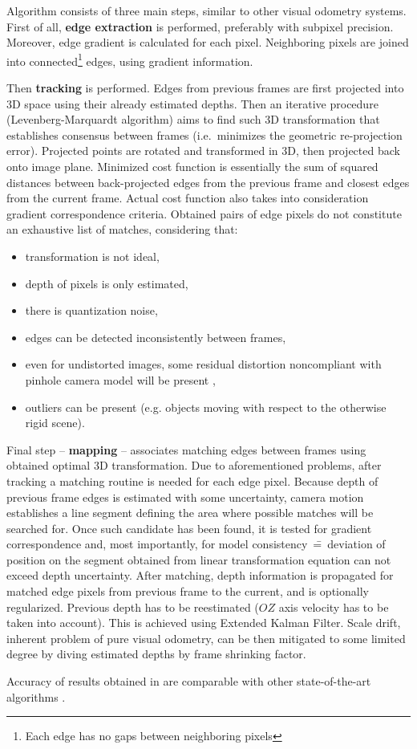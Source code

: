 Algorithm consists of three main steps, similar to other visual odometry systems. First of all, \textbf{edge extraction} is performed, preferably with subpixel precision. Moreover, edge gradient is calculated for each pixel. Neighboring pixels are joined into connected\footnote{Each edge has no gaps between neighboring pixels} edges, using gradient information.

Then \textbf{tracking} is performed. Edges from previous frames are first projected into 3D space using their already estimated depths. Then an iterative procedure (Levenberg-Marquardt algorithm) aims to find such 3D transformation that establishes consensus between frames (i.e.~minimizes the geometric re-projection error). Projected points are rotated and transformed in 3D, then projected back onto image plane. Minimized cost function is essentially the sum of squared distances between back-projected edges from the previous frame and closest edges from the current frame. Actual cost function also takes into consideration gradient correspondence criteria. Obtained pairs of edge pixels do not constitute an exhaustive list of matches, considering that:
\begin{itemize}
\item transformation is not ideal,
\item depth of pixels is only estimated,
\item there is quantization noise,
\item edges can be detected inconsistently between frames,
\item even for undistorted images, some residual distortion noncompliant with pinhole camera model will be present \cite{barreto2007non},
\item outliers can be present (e.g. objects moving with respect to the otherwise rigid scene).
\end{itemize}
 
Final step -- \textbf{mapping} -- associates matching edges between frames using obtained optimal 3D transformation. Due to aforementioned problems, after tracking a matching routine is needed for each edge pixel. Because depth of previous frame edges is estimated with some uncertainty, camera motion establishes a line segment defining the area where possible matches will be searched for. Once such candidate has been found, it is tested for gradient correspondence and, most importantly, for model consistency~\==~deviation of position on the segment obtained from linear transformation equation can not exceed depth uncertainty. After matching, depth information is propagated for matched edge pixels from previous frame to the current, and is optionally regularized. Previous depth has to be reestimated ($OZ$ axis velocity has to be taken into account). This is achieved using Extended Kalman Filter. Scale drift, inherent problem of pure visual odometry, can be then mitigated to some limited degree by diving estimated depths by frame shrinking factor.

Accuracy of results obtained in \cite{jose2015realtime} are comparable with other state-of-the-art algorithms \cite{yang2017direct}.


